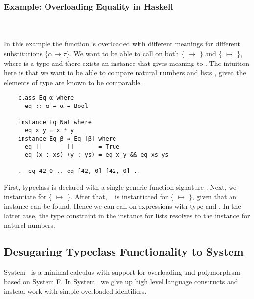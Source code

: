 \subsubsection{Example: Overloading Equality in Haskell}\hfill\\\\
In this example the function  is overloaded with different meanings for different substitutions $\{α \mapsto τ\}$. 
We want to be able to call  on both $\{$ $\mapsto$ $\}$ and $\{$ $\mapsto$ \inl{[β]}$\}$, where  is a type and there exists an instance that gives meaning to . The intuition here is that we want to be able to compare natural numbers  and lists \mono{[β]}, given the elements of type  are known to be comparable.
\begin{verbatim}
    class Eq α where
      eq :: α → α → Bool 

    instance Eq Nat where
      eq x y = x ≐ y
    instance Eq β ⇒ Eq [β] where
      eq []       []       = True
      eq (x : xs) (y : ys) = eq x y && eq xs ys 

    .. eq 42 0 .. eq [42, 0] [42, 0] ..
\end{verbatim}
First, typeclass  is declared with a single generic function signature . Next, we instantiate  for $\{$ $\mapsto$ $\}$. 
After that, \  is instantiated for $\{$ $\mapsto$ \inl{[β]}$\}$, given that an instance  can be found.
Hence we can call  on expressions with type  and \inl{[Nat]}. In the latter case, the type constraint  in the instance for lists resolves to the instance for natural numbers.

\subsection{Desugaring Typeclass Functionality to System \Fo}
System \Fo\ is a minimal calculus with support for overloading and polymorphism based on System F.  
In System \Fo\ we give up high level language constructs and instead work with simple overloaded identifiers. 

